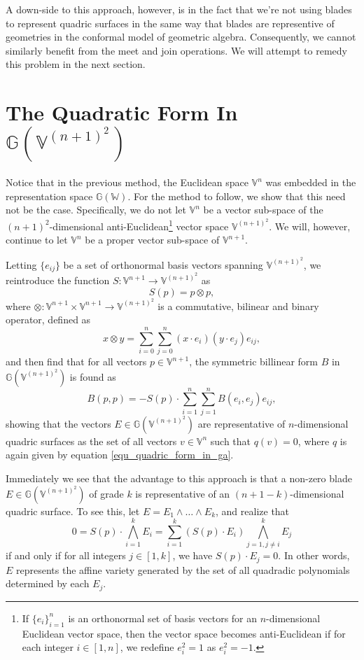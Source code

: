 \documentclass{birkjour}
\theoremstyle{definition}
\theoremstyle{remark}
\numberwithin{equation}{section}
\newcommand{\G}{\mathbb{G}}
\newcommand{\V}{\mathbb{V}}
\newcommand{\W}{\mathbb{W}}
\begin{document}
A down-side to this approach, however, is in the fact that we're not using blades
to represent quadric surfaces in the same way that blades are representive of geometries
in the conformal model of geometric algebra.  Consequently, we cannot similarly benefit
from the meet and join operations.
We will attempt to remedy this problem in the next section.

\section{The Quadratic Form In $\G(\V^{(n+1)^2})$}

Notice that in the previous method, the Euclidean space $\V^n$ was
embedded in the representation space $\G(\W)$.  For the method to
follow, we show that this need not be the case.  Specifically, we
do not let $\V^n$ be a vector sub-space of the $(n+1)^2$-dimensional
anti-Euclidean\footnote{If $\{e_i\}_{i=1}^n$ is an orthonormal set of basis
vectors for an $n$-dimensional Euclidean vector space, then the vector space
becomes anti-Euclidean if for each integer $i\in[1,n]$, we redefine $e_i^2=1$ as $e_i^2=-1$.}
vector space $\V^{(n+1)^2}$.
We will, however, continue to let $\V^n$ be a proper vector sub-space of $\V^{n+1}$.

Letting $\{e_{ij}\}$ be a set
of orthonormal basis vectors spanning $\V^{(n+1)^2}$, we reintroduce the
function $S:\V^{n+1}\to\V^{(n+1)^2}$ as
\begin{equation}
S(p) = p\otimes p,
\end{equation}
where $\otimes:\V^{n+1}\times\V^{n+1}\to\V^{(n+1)^2}$ is a commutative,
bilinear and binary operator, defined as
\begin{equation}
x\otimes y = \sum_{i=0}^n\sum_{j=0}^n(x\cdot e_i)(y\cdot e_j)e_{ij},
\end{equation}
and then find that for all vectors $p\in\V^{n+1}$, the symmetric billinear form
$B$ in $\G(\V^{(n+1)^2})$ is found as
\begin{equation}\label{equ_quadric_intersectable}
B(p,p) = -S(p)\cdot\sum_{i=1}^n\sum_{j=1}^n B(e_i,e_j)e_{ij},
\end{equation}
showing that the vectors $E\in\G(\V^{(n+1)^2})$ are representative
of $n$-dimensional quadric surfaces as the set of all vectors $v\in\V^n$
such that $q(v)=0$, where $q$ is again given by equation \eqref{equ_quadric_form_in_ga}.

Immediately we see that the advantage to this approach is that a
non-zero blade $E\in\G(\V^{(n+1)^2})$ of grade $k$ is representative
of an $(n+1-k)$-dimensional quadric surface.  To see this,
let $E=E_1\wedge\dots\wedge E_k$, and realize that
\begin{equation}
0 = S(p)\cdot\bigwedge_{i=1}^k E_i = \sum_{i=1}^k (S(p)\cdot E_i)\bigwedge_{j=1,j\neq i}^k E_j
\end{equation}
if and only if for all integers $j\in[1,k]$, we have $S(p)\cdot E_j=0$.  In other words,
$E$ represents the affine variety generated by the set of all quadradic polynomials
determined by each $E_j$.
\end{document}
